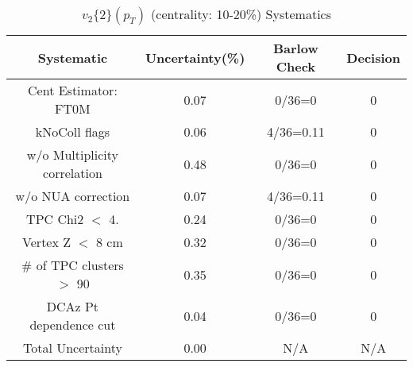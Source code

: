 \begin{table}[htbp]
\caption{$v_2\{2\}(p_{T})$ (centrality: 10-20\%) Systematics}
\label{tab:Sys_pTDiffv2}
\centering
\begin{tabular}{|c|c|c|c|}
\hline
Systematic & Uncertainty(\%) & Barlow Check & Decision \\
\hline
Cent Estimator: FT0M & 0.07 & 0/36=0 & 0 \\
kNoColl flags & 0.06 & 4/36=0.11 & 0 \\
w/o Multiplicity correlation & 0.48 & 0/36=0 & 0 \\
w/o NUA correction & 0.07 & 4/36=0.11 & 0 \\
TPC Chi2 $<$ 4. & 0.24 & 0/36=0 & 0 \\
Vertex Z $<$ 8 cm & 0.32 & 0/36=0 & 0 \\
\# of TPC clusters $>$ 90 & 0.35 & 0/36=0 & 0 \\
DCAz Pt dependence cut & 0.04 & 0/36=0 & 0 \\
\hline
Total Uncertainty & 0.00 & N/A & N/A \\
\hline
\end{tabular}
\end{table}
